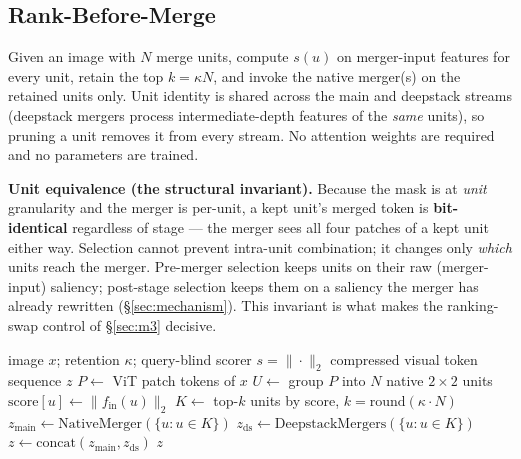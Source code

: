 \documentclass[sigconf,review,anonymous]{acmart}
\begin{document}
\subsection{Rank-Before-Merge}\label{sec:rbm}

Given an image with $N$ merge units, compute $s(u)$ on merger-input features for
every unit, retain the top $k = \kappa N$, and invoke the native merger(s) on
the retained units only. Unit identity is shared across the main and deepstack
streams (deepstack mergers process intermediate-depth features of the
\emph{same} units), so pruning a unit removes it from every stream. No attention
weights are required and no parameters are trained.

\textbf{Unit equivalence (the structural invariant).} Because the mask is at
\emph{unit} granularity and the merger is per-unit, a kept unit's merged token
is \textbf{bit-identical} regardless of stage --- the merger sees all four
patches of a kept unit either way. Selection cannot prevent intra-unit
combination; it changes only \emph{which} units reach the merger. Pre-merger
selection keeps units on their raw (merger-input) saliency; post-stage selection
keeps them on a saliency the merger has already rewritten (\S\ref{sec:mechanism}).
This invariant is what makes the ranking-swap control of \S\ref{sec:m3}
decisive.

\begin{algorithm}[t]
  \caption{Rank-Before-Merge (RBM), one image}
  \label{alg:rbm}
  \begin{algorithmic}[1]
    \REQUIRE image $x$; retention $\kappa$; query-blind scorer $s = \|\cdot\|_2$
    \ENSURE compressed visual token sequence $z$
    \STATE $P \gets$ ViT patch tokens of $x$ 
    \STATE $U \gets$ group $P$ into $N$ native $2\!\times\!2$ units 
      \STATE $\mathrm{score}[u] \gets \| f_{\mathrm{in}}(u) \|_2$ 
    \ENDFOR
    \STATE $K \gets$ top-$k$ units by score, $k = \mathrm{round}(\kappa \cdot N)$ 
    \STATE $z_{\mathrm{main}} \gets \mathrm{NativeMerger}(\{u : u \in K\})$ 
    \STATE $z_{\mathrm{ds}} \gets \mathrm{DeepstackMergers}(\{u : u \in K\})$ 
    \STATE $z \gets \mathrm{concat}(z_{\mathrm{main}}, z_{\mathrm{ds}})$
    \RETURN $z$ 
  \end{algorithmic}
\end{algorithm}
\end{document}
